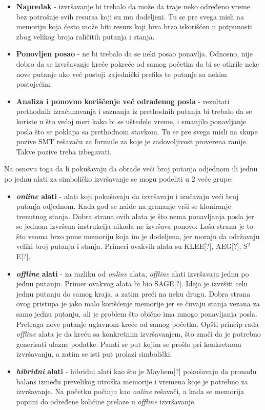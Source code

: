 \documentclass[12pt]{article}
\begin{document}
\begin{itemize}
    \item \textbf{Napredak} - izvršavanje bi trebalo da može da traje neko određeno vreme bez potrošnje svih resursa koji su mu dodeljeni. Tu se pre svega misli na memoriju koja često može biti resurs koji biva brzo iskorišćen u potpunosti zbog velikog broja raličitih putanja i stanja.
    
    \item \textbf{Ponovljen posao} - ne bi trebalo da se neki posao ponavlja. Odnosno, nije dobro da se izvršavanje kreće pokreće od samog početka da bi se otkrile neke nove putanje ako već postoji zajednički prefiks te putanje sa nekim postojećim.
    
    \item \textbf{Analiza i ponovno korišćenje već odrađenog posla} - rezultati prethodnih izračunavanja i saznanja iz prethodnih putanja bi trebalo da se koriste u što većoj meri kako bi se uštedelo vreme, i smanjilo ponavljanje posla što se poklapa sa prethodnom stavkom. Tu se pre svega misli na skupe pozive SMT rešavaču za formule za koje je zadovoljivost proverena ranije. Takve pozive treba izbegavati.
\end{itemize}
\bigskip
Na osnovu toga da li pokušavaju da obrade veći broj putanja odjednom ili jednu po jednu alati za simboličko izvršavanje se mogu podeliti u 2 veće grupe:
\begin{itemize}
    \item \textbf{\textit{online} alati} - alati koji pokušavaju da izvršavaju i izučavaju veći broj putanja odjednom. Kada god se naiđe na grananje vrši se kloniranje trenutnog stanja. Dobra strana ovih alata je što nema ponavljanja posla jer se jednom izvršena instrukcija nikada ne izvršava ponovo. Loša strana je to što veoma brzo pune memoriju koja im je dodeljena, jer moraju da održavaju veliki broj putanja i stanja. Primeri ovakvih alata su KLEE[?], AEG[?], S$^2$E[?].
    
    \item \textbf{\textit{offline} alati} - za razliku od \textit{online} alata, \textit{offline} alati izvršavaju jednu po jednu putanju. Primer ovakvog alata bi bio SAGE[?]. Ideja je izvršiti celu jednu putanju do samog kraja, a zatim preći na neku drugu. Dobra strana ovog pristupa je jako malo korišćenje memorije jer se čuvaju stanja vezana za samo jednu putanju, ali je problem što obično ima mnogo ponavljanja posla. Pretraga nove putanje uglavnom kreće od samog početka. Opšti princip rada \textit{offline} alata je da kreću sa konkretnim izvršavanjem, što znači da je potrebno generisati ulazne podatke. Pamti se put kojim se prošlo pri konkretnom izvršavanju, a zatim se isti put prolazi simbolički. 
    
    \item \textbf{\textit{hibridni} alati} - hibridni alati kao što je Mayhem[?] pokušavaju da pronađu balans između prevelikog utroška memorije i vremena koje je potrebno za izvršavanje. Na početku počinju kao \textit{online} rešavači, a kada se memorija popuni do određene količine prelaze u \textit{offline} izvršavanje.
\end{itemize}
\end{document}
